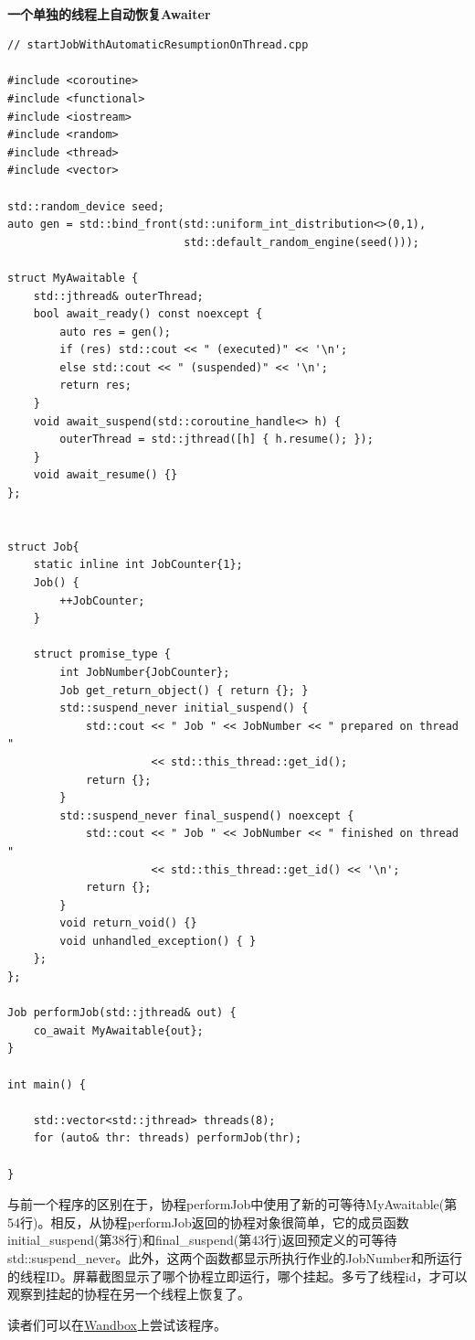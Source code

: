 \hspace*{\fill} \\ %
\noindent
\textbf{一个单独的线程上自动恢复Awaiter}
\begin{lstlisting}[style=styleCXX]
// startJobWithAutomaticResumptionOnThread.cpp

#include <coroutine>
#include <functional>
#include <iostream>
#include <random>
#include <thread>
#include <vector>

std::random_device seed;
auto gen = std::bind_front(std::uniform_int_distribution<>(0,1),
						   std::default_random_engine(seed()));

struct MyAwaitable {
	std::jthread& outerThread;
	bool await_ready() const noexcept {
		auto res = gen();
		if (res) std::cout << " (executed)" << '\n';
		else std::cout << " (suspended)" << '\n';
		return res;
	}
	void await_suspend(std::coroutine_handle<> h) {
		outerThread = std::jthread([h] { h.resume(); });
	}
	void await_resume() {}
};


struct Job{
	static inline int JobCounter{1};
	Job() {
		++JobCounter;
	}

	struct promise_type {
		int JobNumber{JobCounter};
		Job get_return_object() { return {}; }
		std::suspend_never initial_suspend() {
			std::cout << " Job " << JobNumber << " prepared on thread "
			          << std::this_thread::get_id();
			return {};
		}
		std::suspend_never final_suspend() noexcept {
			std::cout << " Job " << JobNumber << " finished on thread "
			          << std::this_thread::get_id() << '\n';
			return {};
		}
		void return_void() {}
		void unhandled_exception() { }
	};
};

Job performJob(std::jthread& out) {
	co_await MyAwaitable{out};
}

int main() {

	std::vector<std::jthread> threads(8);
	for (auto& thr: threads) performJob(thr);

}
\end{lstlisting}

与前一个程序的区别在于，协程performJob中使用了新的可等待MyAwaitable(第54行)。相反，从协程performJob返回的协程对象很简单，它的成员函数initial\_suspend(第38行)和final\_suspend(第43行)返回预定义的可等待std::suspend\_never。此外，这两个函数都显示所执行作业的JobNumber和所运行的线程ID。屏幕截图显示了哪个协程立即运行，哪个挂起。多亏了线程id，才可以观察到挂起的协程在另一个线程上恢复了。

读者们可以在\href{https://wandbox.org/permlink/skHgWKF0SYAwp8Dm}{Wandbox}上尝试该程序。

